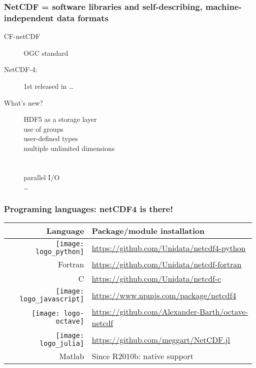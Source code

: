 \begin{frame}
\frametitle{NetCDF = software libraries and self-describing, machine-independent data formats}

\begin{description}
\item[CF-netCDF] OGC standard 

\item[NetCDF-4:] 1st released in \ldots {}

\item[What's new?]
HDF5 as a storage layer\\
use of groups\\
user-defined types\\
multiple unlimited dimensions\\
\\
\\ 
parallel I/O\\
\ldots 
\end{description}



\end{frame}


\begin{frame}
\frametitle{Programing languages: netCDF4 is there!}
\begin{table}
\begin{tabular}{rl}
\toprule
Language 	& 		Package/module installation \\
\midrule
\texttt{[image: logo\_python]}		& 		\url{https://github.com/Unidata/netcdf4-python}\\
Fortran											& 		\url{https://github.com/Unidata/netcdf-fortran}\\
C												& 		\url{https://github.com/Unidata/netcdf-c}\\
\texttt{[image: logo\_javascript]}	& 		\url{https://www.npmjs.com/package/netcdf4}\\
\texttt{[image: logo-octave]}		&		\url{https://github.com/Alexander-Barth/octave-netcdf}\\
\texttt{[image: logo\_julia]}		&  		\url{https://github.com/meggart/NetCDF.jl}\\
Matlab											&		Since R2010b: native support\\
\bottomrule
\end{tabular}
\end{table}


\end{frame}

